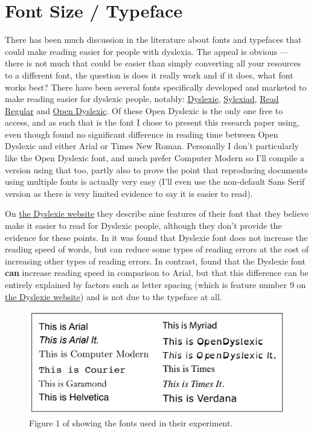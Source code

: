 \documentclass[17pt]{memoir}
\begin{document}
\section*{Font Size / Typeface}

There has been much discussion in the literature about fonts and typefaces that could make reading easier for people with dyslexia. The appeal is obvious --- there is not much that could be easier than simply converting all your resources to a different font, the question is does it really work and if it does, what font works best? There have been several fonts specifically developed and marketed to make reading easier for dyslexic people, notably: \href{https://www.dyslexiefont.com/en/typeface/}{Dyslexie}, \href{http://www.robsfonts.com/fonts/sylexiad}{Sylexiad}, \href{http://www.readregular.com/english/intro.html}{Read Regular} and \href{https://www.opendyslexic.org/}{Open Dyslexic}. Of these Open Dyslexic is the only one free to access, and as such that is the font I chose to present this research paper using, even though \cite{Wery2017} found no significant difference in reading time between Open Dyslexic and either Arial or Times New Roman. Personally I don't particularly like the Open Dyslexic font, and much prefer Computer Modern so I'll compile a version using that too, partly also to prove the point that reproducing documents using multiple fonts is actually very easy (I'll even use the non-default Sans Serif version as there is very limited evidence to say it is easier to read).

On \href{https://www.dyslexiefont.com/en/typeface/}{the Dyslexie website} they describe nine features of their font that they believe make it easier to read for Dyslexic people, although they don't provide the evidence for these points. In \cite{Leeuw2010} it was found that Dyslexie font does not increase the reading speed of words, but can reduce some types of reading errors at the cost of increasing other types of reading errors. In contrast, \cite{Marinus2016} found that the Dyslexie font \textbf{can} increase reading speed in comparison to Arial, but that this difference can be entirely explained by factors such as letter spacing (which is feature number 9 on \href{https://www.dyslexiefont.com/en/typeface/}{the Dyslexie website}) and is not due to the typeface at all. 

\begin{figure}
\begin{center}
\includegraphics{figures/RolloFonts.PNG}
\end{center}
\caption{Figure 1 of \cite{Rello2013} showing the fonts used in their experiment. \label{fig:RelloFonts}}
\end{figure}
\end{document}
